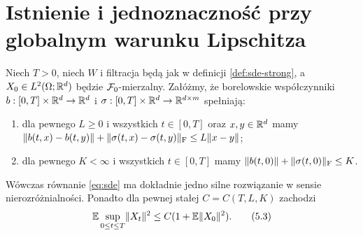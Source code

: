 \section{Istnienie i jednoznaczność przy globalnym warunku Lipschitza}
\begin{twierdzenie}
\label{th:sde-global}
Niech $T>0$, niech $W$ i filtracja będą jak w definicji
\ref{def:sde-strong}, a $X_0\in L^2(\Omega;\mathbb{R}^d)$ będzie
$\mathcal{F}_0$-mierzalny. Załóżmy, że borelowskie współczynniki
$b:[0,T]\times\mathbb{R}^d\to\mathbb{R}^d$ i
$\sigma:[0,T]\times\mathbb{R}^d\to\mathbb{R}^{d\times m}$ spełniają:
\begin{enumerate}[label=(\roman*)]
\item dla pewnego $L\ge0$ i wszystkich $t\in[0,T]$ oraz
$x,y\in\mathbb{R}^d$ mamy
$\lVert b(t,x)-b(t,y)\rVert+\lVert \sigma(t,x)-\sigma(t,y)\rVert_{\mathrm F}
\le L\lVert x-y\rVert$;
\item dla pewnego $K<\infty$ i wszystkich $t\in[0,T]$
mamy $\lVert b(t,0)\rVert+\lVert \sigma(t,0)\rVert_{\mathrm F}\le K$.
\end{enumerate}
Wówczas równanie \eqref{eq:sde} ma dokładnie jedno silne
rozwiązanie w sensie nierozróżnialności. Ponadto dla pewnej
stałej $C=C(T,L,K)$ zachodzi
\[
\mathbb{E}\sup_{0\le t\le T}\lVert X_t\rVert^2
\le C(1+\mathbb{E}\lVert X_0\rVert^2).
\tag{5.3}\label{eq:sde-moment}
\]
\end{twierdzenie}

